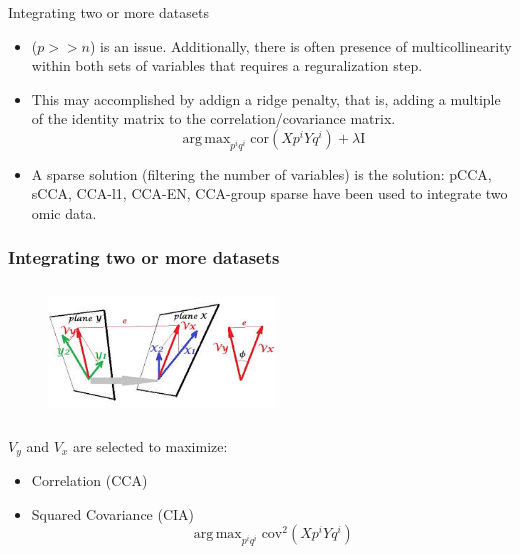 \documentclass[10pt,xcolor=dvipsnames]{beamer}\usepackage[]{graphicx}\usepackage[]{color}
\DeclareMathOperator{\argmax}{arg\,max}
\begin{document}
\begin{frame}[plain]{Integrating two or more datasets}

\begin{itemize}
\item ($p >> n$) is an issue. Additionally, there is often presence of multicollinearity within both sets of variables that requires a reguralization step.
\item This may accomplished by addign a ridge penalty, that is, adding a multiple of the identity matrix to the correlation/covariance matrix.
$$ \argmax_{p^i q^i} \text{cor}(Xp^i Yq^i) + \lambda \text{I}$$

\item A sparse solution (filtering the number of variables) is the solution: pCCA, sCCA, CCA-l1, CCA-EN, CCA-group sparse have been used to integrate two omic data.
\end{itemize}
\end{frame}



\begin{frame}[plain]\frametitle{Integrating two or more datasets}

\begin{figure}
\begin{center}
 \includegraphics[height=3.5cm, width=6cm]{figures/canonical_correlation.jpg}
\end{center}
\end{figure}

$V_y$ and $V_x$ are selected to maximize:

\begin{itemize}
 \item Correlation (CCA)
 \item Squared Covariance (CIA)
       $$ \argmax_{p^i q^i} \text{cov}^2(Xp^i Yq^i)$$
\end{itemize}

\end{frame}
\end{document}
